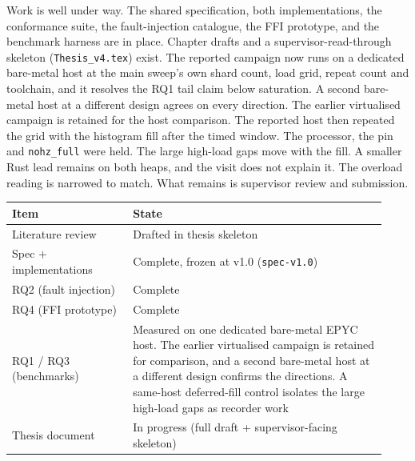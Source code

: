 \documentclass[11pt,a4paper]{article}
\begin{document}
Work is well under way. The shared specification, both implementations, the conformance
suite, the fault-injection catalogue, the FFI prototype, and the benchmark harness are in
place. Chapter drafts and a supervisor-read-through skeleton (\texttt{Thesis\_v4.tex}) exist.
The reported campaign now runs on a dedicated bare-metal host at the main sweep's own
shard count, load grid, repeat count and toolchain, and it resolves the RQ1 tail claim
below saturation. A second bare-metal host at a different design agrees on every
direction. The earlier virtualised campaign is retained for the host comparison. The
reported host then repeated the grid with the histogram fill after the timed
window. The processor, the pin and \texttt{nohz\_full} were held. The large
high-load gaps move with the fill. A smaller Rust lead remains on both heaps,
and the visit does not explain it.
The overload reading is narrowed to match. What remains is supervisor
review and submission.

\begin{center}
\begin{tabular}{@{}R{0.30\linewidth} R{0.63\linewidth}@{}}
\hline\hline
Item & State \\
\hline
Literature review & Drafted in thesis skeleton \\
Spec + implementations & Complete, frozen at v1.0 (\texttt{spec-v1.0}) \\
RQ2 (fault injection) & Complete \\
RQ4 (FFI prototype) & Complete \\
RQ1 / RQ3 (benchmarks) & Measured on one dedicated bare-metal EPYC host. The
earlier virtualised campaign is retained for comparison, and a second
bare-metal host at a different design confirms the directions. A same-host
deferred-fill control isolates the large high-load gaps as recorder work \\
Thesis document & In progress (full draft + supervisor-facing skeleton) \\
\hline
\end{tabular}
\end{center}
\end{document}
